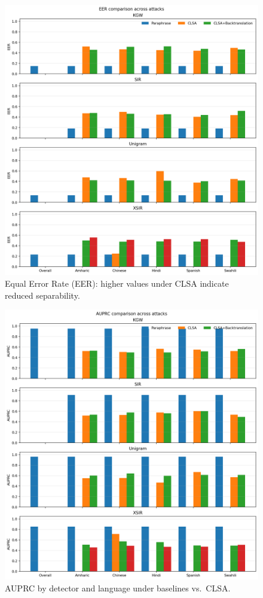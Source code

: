 \documentclass{article}
\begin{document}
%
\begin{figure}[h]
\centering
\includegraphics[width=\linewidth]{eer_bars.png}
\caption{Equal Error Rate (EER): higher values under CLSA indicate reduced separability.}
\end{figure}
%
\begin{figure}[h]
\centering
\includegraphics[width=\linewidth]{auprc_bars.png}
\caption{AUPRC by detector and language under baselines vs.\ CLSA.}
\end{figure}
\end{document}

